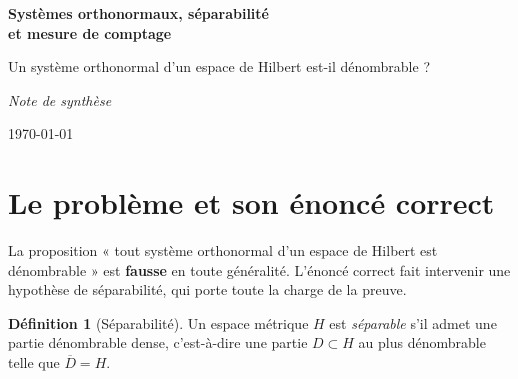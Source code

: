 \documentclass[11pt,a4paper]{article}
\theoremstyle{plain}
\theoremstyle{definition}
\newtheorem{definition}[theoreme]{Définition}
\newcommand{\HH}{H}
\begin{document}
\begin{titlepage}
\centering
\vspace*{3cm}
{\Huge\bfseries Systèmes orthonormaux, séparabilité\\[0.4em] et mesure de comptage\par}
\vspace{1.5cm}
{\large Un système orthonormal d'un espace de Hilbert est-il dénombrable ?\par}
\vspace{2.5cm}
{\large\itshape Note de synthèse\par}
\vfill
{\large \today\par}
\end{titlepage}

\tableofcontents
\bigskip

\begin{abstract}
\noindent
On examine la question : \emph{un système orthonormal d'un espace de Hilbert
est-il nécessairement dénombrable ?} La réponse est négative en général, mais
affirmative sous l'hypothèse de \textbf{séparabilité}. On isole le mécanisme
purement métrique de la preuve — la séparation uniforme des vecteurs à
distance~$\sqrt{2}$ —, on montre que ce même mécanisme, \emph{lu à l'envers},
force la non-séparabilité de $\ell^2(I)$ lorsque $I$ est non dénombrable, puis on
identifie $\ell^2(I)$ comme l'espace $L^2$ associé à la \textbf{mesure de
comptage}. On clôt par une analyse du rôle exact joué par cette mesure, en
corrigeant au passage un point subtil sur les fonctions étagées.
\end{abstract}

\section{Le problème et son énoncé correct}

La proposition « tout système orthonormal d'un espace de Hilbert est
dénombrable » est \textbf{fausse} en toute généralité. L'énoncé correct fait
intervenir une hypothèse de séparabilité, qui porte toute la charge de la preuve.

\begin{definition}[Séparabilité]
Un espace métrique $\HH$ est \emph{séparable} s'il admet une partie dénombrable
dense, c'est-à-dire une partie $D \subset \HH$ au plus dénombrable telle que
$\overline{D} = \HH$.
\end{definition}
\end{document}
